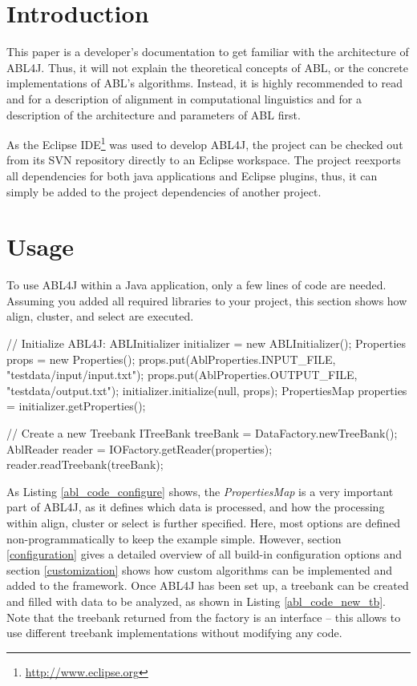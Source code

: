 \documentclass[12pt,a4paper]{article}
\newcommand{\link}[1]{\href{#1}{#1}}
\begin{document}
\section{Introduction}
This paper is a developer's documentation to get familiar with the architecture
of ABL4J. Thus, it will not explain the theoretical concepts of ABL, or the
concrete implementations of ABL's algorithms. Instead, it is highly recommended to
read \cite{vanZaanen:2001p141} and \cite{vanZaanen:2003p72} for a description
of alignment in computational linguistics and \cite{Geertzen:2006p11} for a
description of the architecture and parameters of ABL first.

As the Eclipse IDE\footnote{\link{http://www.eclipse.org}} was used to develop
ABL4J, the project can be checked out from its SVN repository directly to an
Eclipse workspace. The project reexports all dependencies for both java
applications and Eclipse plugins, thus, it can simply be added to the project
dependencies of another project.

\section{Usage}
\label{usage}
To use ABL4J within a Java application, only a few lines of code are needed.
Assuming you added all required libraries to your project, this section shows
how align, cluster, and select are executed.

\begin{java} [caption={Programmatically configuring ABL4J},label={abl_code_configure}] 
		// Initialize ABL4J: ABLInitializer initializer = new ABLInitializer();
		Properties props = new Properties();
		props.put(AblProperties.INPUT_FILE, "testdata/input/input.txt");
		props.put(AblProperties.OUTPUT_FILE, "testdata/output.txt");
		initializer.initialize(null, props);
		PropertiesMap properties = initializer.getProperties();
		
		// Create a new Treebank
		ITreeBank treeBank = DataFactory.newTreeBank();
		AblReader reader = IOFactory.getReader(properties);
		reader.readTreebank(treeBank);
\end{java}

As Listing \ref{abl_code_configure} shows, the \emph{PropertiesMap} is a very
important part of ABL4J, as it defines which data is processed, and how the
processing within align, cluster or select is further specified. Here,
most options are defined non-programmatically to keep the example simple.
However, section \ref{configuration} gives a detailed overview of all
build-in configuration options and section \ref{customization} shows how custom
algorithms can be implemented and added to the framework. Once ABL4J has been
set up, a treebank can be created and filled with data to be analyzed, as shown
in Listing \ref{abl_code_new_tb}. Note that the treebank returned from the
factory is an interface -- this allows to use different treebank
implementations without modifying any code.
\end{document}
